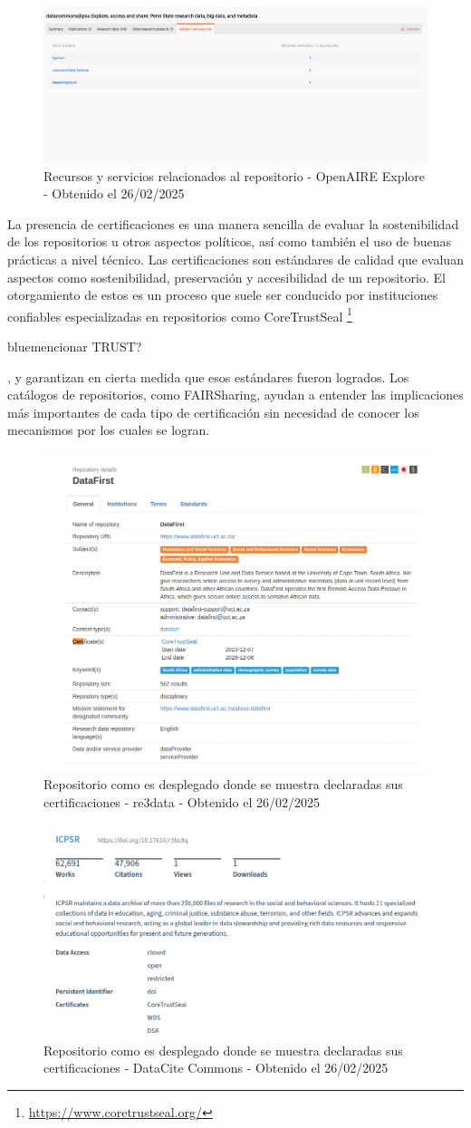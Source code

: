\documentclass[runningheads]{llncs}
\def \bchgon {\begin{color}{blue}}
\def \echgon {\end{color}}
\begin{document}
\begin{figure}
    \centering
    \includegraphics[width=0.5\linewidth]{openaire_recursos_relacionados_a_repositorio.png}
    \caption{Recursos y servicios relacionados al repositorio - OpenAIRE Explore - Obtenido el 26/02/2025}
    \label{fig:openaire_recursos_relacionados_a_repositorio}
\end{figure}


La presencia de certificaciones es una manera sencilla de evaluar la sostenibilidad de los repositorios u otros aspectos políticos, así como también el uso de buenas prácticas a nivel técnico. Las certificaciones son estándares de calidad que evaluan aspectos como sostenibilidad, preservación y accesibilidad de un repositorio. El otorgamiento de estos es un proceso que suele ser conducido por instituciones confiables especializadas en repositorios como CoreTrustSeal \footnote{\url{https://www.coretrustseal.org/}} \bchgon mencionar TRUST?\echgon, y garantizan en cierta medida que esos estándares fueron logrados. Los catálogos de repositorios, como FAIRSharing, ayudan a entender las implicaciones más importantes de cada tipo de certificación sin necesidad de conocer los mecanismos por los cuales se logran.\\

\begin{figure}
    \centering
    \includegraphics[width=0.5\linewidth]{re3data_certified_repo.png}
    \caption{Repositorio como es desplegado donde se muestra declaradas sus certificaciones - re3data - Obtenido el 26/02/2025}
    \label{fig:re3data_certified_repo}
\end{figure}

\begin{figure}
    \centering
    \includegraphics[width=0.5\linewidth]{datacite_certified_repo.png}
    \caption{Repositorio como es desplegado donde se muestra declaradas sus certificaciones - DataCite Commons - Obtenido el 26/02/2025}
    \label{fig:datacite_certified_repo}
\end{figure}
\end{document}
